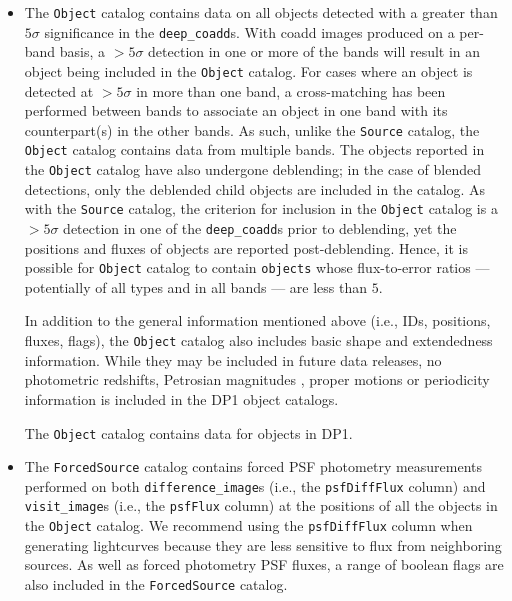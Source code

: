 \begin{itemize}
\item The \texttt{Object} catalog contains data on all objects detected with a greater than $5\sigma$ significance in the \texttt{deep\_coadd}s.
With coadd images produced on a per-band basis, a $>5\sigma$ detection in one or more of the bands will result in an object being included in the \texttt{Object} catalog.
For cases where an object is detected at $>5\sigma$ in more than one band, a cross-matching has been performed between bands to associate an object in one band with its counterpart(s) in the other bands.
As such, unlike the \texttt{Source} catalog, the \texttt{Object} catalog contains data from multiple bands. The objects reported in the \texttt{Object} catalog have also undergone deblending; in the case of blended detections, only the deblended child objects are included in the catalog.
As with the \texttt{Source} catalog, the criterion for inclusion in the \texttt{Object} catalog is a $>5\sigma$ detection in one of the \texttt{deep\_coadd}s prior to deblending, yet the positions and fluxes of objects are reported post-deblending. Hence, it is possible for \texttt{Object} catalog to contain \texttt{objects} whose \gls{flux}-to-error ratios --- potentially of all types and in all bands --- are less than $5$.

In addition to the general information mentioned above (i.e., IDs, positions, fluxes, flags), the \texttt{Object} catalog also includes basic \gls{shape} and extendedness information.
While they may be included in future data releases, no photometric redshifts, Petrosian magnitudes \citep{1976ApJ...209L...1P}, proper motions or periodicity information is included in the \gls{DP1} object catalogs.

The \texttt{Object} catalog contains data for \nobjects objects in \gls{DP1}.


\item The \texttt{ForcedSource} catalog contains forced \gls{PSF} photometry measurements performed on both \texttt{difference\_image}s (i.e., the \texttt{psfDiffFlux} column) and \texttt{visit\_image}s (i.e., the \texttt{psfFlux} column) at the positions of all the objects in the \texttt{Object} catalog.
We recommend using the \texttt{psfDiffFlux} column when generating lightcurves because they are less sensitive to \gls{flux} from neighboring sources.
As well as \gls{forced photometry} PSF fluxes, a range of boolean flags are also included in the \texttt{ForcedSource} catalog.


\end{itemize}
